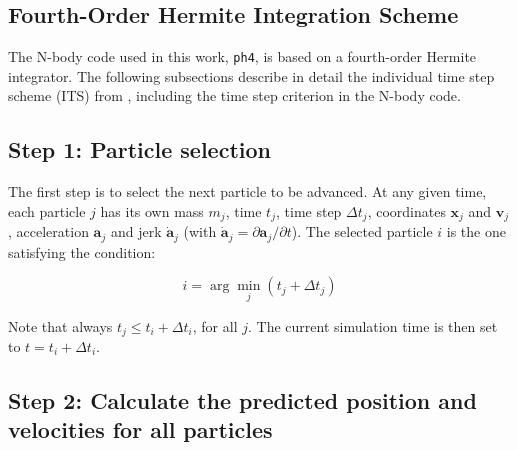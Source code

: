 \begin{appendixs}
	\section{Fourth-Order Hermite Integration Scheme} \label{ap:A}
	The N-body code used in this work, \texttt{ph4}, is based on a fourth-order Hermite integrator. The following subsections describe in detail the individual time step scheme (ITS) from \cite{makino1992}, including the time step criterion in the N-body code.
	
	\subsection{Step 1: Particle selection}
	The first step is to select the next particle to be advanced. At any given time, each particle $j$ has its own mass $m_j$, time $t_j$, time step $\Delta t_j$, coordinates $\mathbf{x}_j$ and $\mathbf{v}_j$, acceleration $\mathbf{a}_j$ and jerk $\dot{\mathbf{a}}_j$ (with $\dot{\mathbf{a}}_j = \partial \mathbf{a}_j / \partial t$). The selected particle $i$ is the one satisfying the condition:
	
	\begin{equation}
		i = \arg\min_j(t_j + \Delta t_j)
	\end{equation}
	
	Note that always $t_j \leq t_i + \Delta t_i$, for all $j$. The current simulation time is then set to $t = t_i + \Delta t_i$.
	
	\subsection{Step 2: Calculate the predicted position and velocities for all particles}
	

\end{appendixs}
